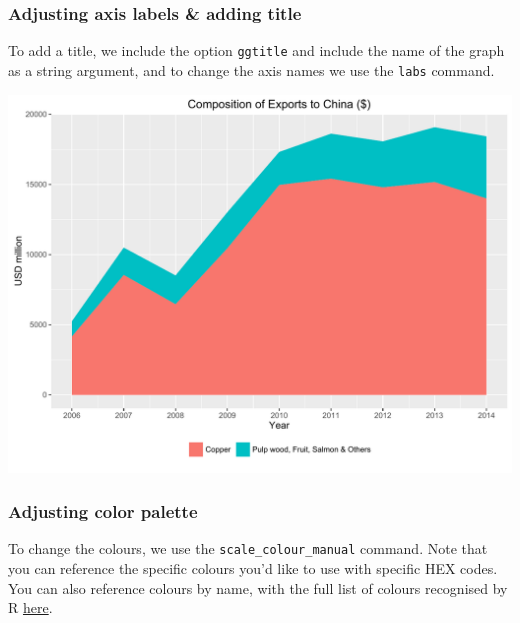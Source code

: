 \documentclass[]{article}
\newenvironment{Shaded}{\begin{snugshade}}{\end{snugshade}}
\newcommand{\KeywordTok}[1]{\textcolor[rgb]{0.13,0.29,0.53}{\textbf{{#1}}}}
\newcommand{\DataTypeTok}[1]{\textcolor[rgb]{0.13,0.29,0.53}{{#1}}}
\newcommand{\StringTok}[1]{\textcolor[rgb]{0.31,0.60,0.02}{{#1}}}
\newcommand{\NormalTok}[1]{{#1}}
\begin{document}
\subsubsection{Adjusting axis labels \& adding
title}\label{adjusting-axis-labels-adding-title-1}

To add a title, we include the option \texttt{ggtitle} and include the
name of the graph as a string argument, and to change the axis names we
use the \texttt{labs} command.

\begin{Shaded}
\end{Shaded}

\begin{center}\includegraphics{0_all_posts_pdf/area_5-1} \end{center}

\subsubsection{Adjusting color palette}\label{adjusting-color-palette-1}

To change the colours, we use the \texttt{scale\_colour\_manual}
command. Note that you can reference the specific colours you'd like to
use with specific HEX codes. You can also reference colours by name,
with the full list of colours recognised by R
\href{http://www.stat.columbia.edu/~tzheng/files/Rcolor.pdf}{here}.
\end{document}
